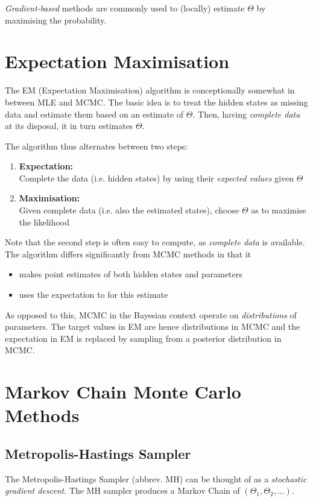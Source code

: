 \textit{Gradient-based} methods are commonly used to (locally) estimate $\Theta$ by maximising the probability. 


\section{Expectation Maximisation}

The EM (Expectation Maximisation) algorithm is conceptionally somewhat in between MLE and MCMC. 
The basic idea is to treat the hidden states as missing data and estimate them based on an estimate of $\Theta$. Then, having \textit{complete data} at its disposal, it in turn estimates $\Theta$. 

The algorithm thus alternates between two steps: 
\begin{enumerate}
	\item \textbf{Expectation:} \\
		  Complete the data (i.e. hidden states) by using their \textit{expected values} given $\Theta$
	\item \textbf{Maximisation:} \\
		  Given complete data (i.e. also the estimated states), choose $\Theta$ as to maximise the likelihood 
\end{enumerate} 

Note that the second step is often easy to compute, as \textit{complete data} is available. The algorithm differs significantly from MCMC methods in that it 
\begin{itemize}
	\item makes point estimates of both hidden states and parameters
	\item uses the expectation to for this estimate
\end{itemize}

As opposed to this, MCMC in the Bayesian context operate on \textit{distributions} of parameters. The target values in EM are hence distributions in MCMC and the expectation in EM is replaced by sampling from a posterior distribution in MCMC. 


\section{Markov Chain Monte Carlo Methods}

	\subsection{Metropolis-Hastings Sampler}
	The Metropolis-Hastings Sampler (abbrev. MH) can be thought of as a \textit{stochastic gradient descent}. The MH sampler produces a Markov Chain of $\left(\Theta_1, \Theta_2, \dots \right)$. 
	

